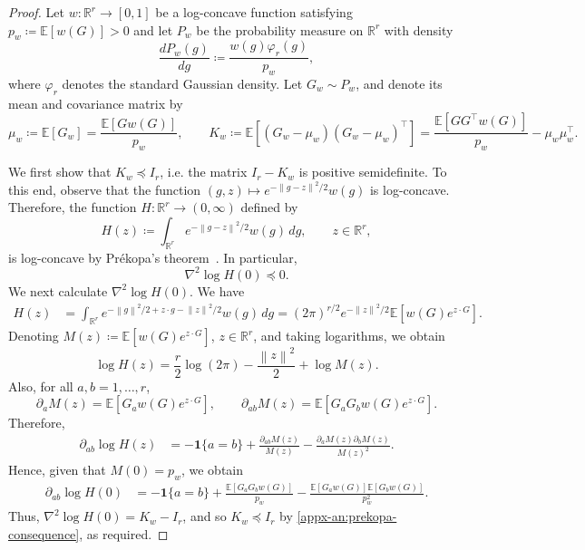 \documentclass[11pt,letterpaper]{article}
\theoremstyle{remark}
\newcommand{\E}{\mathbb E}
\newcommand{\R}{\mathbb R}
\newcommand{\norm}[1]{\left\lVert#1\right\rVert}
\newcommand{\dd}{\,d}
\begin{document}
\begin{proof}

Let \(w:\R^r\to[0,1]\) be a log-concave function
satisfying \(p_w\coloneqq\E[w(G)]>0\) and let
\(P_w\) be the probability measure on \(\R^r\) with density
\[
\frac{d P_w(g)}{dg}
\coloneqq\frac{w(g)\varphi_r(g)}{p_w},
\]
where \(\varphi_r\) denotes the standard Gaussian density.
Let \(G_w\sim P_w\), and denote its mean and covariance
matrix by
\[
\mu_w\coloneqq\E[G_w]=\frac{\E[Gw(G)]}{p_w},\qquad
K_w\coloneqq\E[(G_w-\mu_w)(G_w-\mu_w)^\top]=\frac{\E[GG^\top w(G)]}{p_w}-\mu_w\mu_w^\top.
\]

We first show that \(K_w\preceq I_r\), i.e. the matrix $I_r - K_w$ is positive semidefinite. To this end, observe that the function $(g, z)\mapsto e^{-\norm{g-z}^2/2}w(g)$
is log-concave. Therefore, the function \(H:\R^r\to(0,\infty)\) defined by
\[
H(z)\coloneqq
\int_{\R^r}e^{-\norm{g-z}^2/2}w(g)\dd g,\qquad z\in\R^r,
\]
is log-concave by Pr\'ekopa's theorem~\cite[Theorem~6]{Prekopa1973}.
In particular,
\begin{equation}\label{appx-an:prekopa-consequence}
\nabla^2\log H(0)\preceq0.
\end{equation}
We next calculate $\nabla^2\log H(0)$.
We have
\begin{align*}
H(z)
&=\int_{\R^r}
 e^{-\norm g^2/2+z\cdot g-\norm z^2/2}
 w(g)\dd g
 =(2\pi)^{r/2}e^{-\norm z^2/2}
 \E[w(G)e^{z\cdot G}].
\end{align*}
Denoting \(M(z)\coloneqq\E[w(G)e^{z\cdot G}]\), $z\in\R^r$, and taking logarithms, we obtain
\[
\log H(z)
=\frac r2\log(2\pi)-\frac{\norm z^2}{2}
 +\log M(z).
\]
Also, for all \(a, b = 1,\dots, r\),
\[
\partial_a M(z)
=\E[G_aw(G)e^{z\cdot G}],
\qquad
\partial_{ab}M(z)
=\E[G_aG_bw(G)e^{z\cdot G}].
\]
Therefore,
\begin{align*}
\partial_{ab}\log H(z)
&=-\mathbf 1\{a=b\}
 +\frac{\partial_{ab}M(z)}{M(z)}
 -\frac{\partial_aM(z)\partial_bM(z)}{M(z)^2}.
\end{align*}
Hence, given that \(M(0)=p_w\), we obtain
\begin{align*}
\partial_{ab}\log H(0)
&=-\mathbf 1\{a=b\}
 +\frac{\E[G_aG_bw(G)]}{p_w}
  -\frac{\E[G_aw(G)]\E[G_bw(G)]}{p_w^2}.
\end{align*}
Thus, $\nabla^2\log H(0)=K_w-I_r$, and so $K_w\preceq I_r$ by \eqref{appx-an:prekopa-consequence}, as required.


\end{proof}
\end{document}
